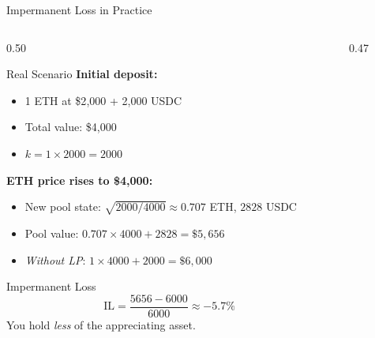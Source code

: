 \documentclass[8pt,aspectratio=169]{beamer}
\begin{document}
\begin{frame}{Impermanent Loss in Practice}
  \begin{columns}[T]
    \begin{column}{0.50\textwidth}
      \begin{block}{Real Scenario}
        \textbf{Initial deposit:}
        \begin{itemize}\setlength\itemsep{1pt}
          \item 1 ETH at \$2{,}000 + 2{,}000 USDC
          \item Total value: \$4{,}000
          \item $k = 1 \times 2000 = 2000$
        \end{itemize}

        \vspace{2mm}
        \textbf{ETH price rises to \$4{,}000:}
        \begin{itemize}\setlength\itemsep{1pt}
          \item New pool state: $\sqrt{2000/4000} \approx 0.707$ ETH, $2828$ USDC
          \item Pool value: $0.707 \times 4000 + 2828 = \$5{,}656$
          \item \textit{Without LP}: $1 \times 4000 + 2000 = \$6{,}000$
        \end{itemize}

        \vspace{2mm}
        \begin{alertblock}{Impermanent Loss}
          \[
            \text{IL} = \frac{5656 - 6000}{6000} \approx -5.7\%
          \]
          You hold \textit{less} of the appreciating asset.
        \end{alertblock}
      \end{block}
    \end{column}
    \begin{column}{0.47\textwidth}
      \begin{center}
\end{center}
\end{column}
\end{columns}
\end{frame}
\end{document}
